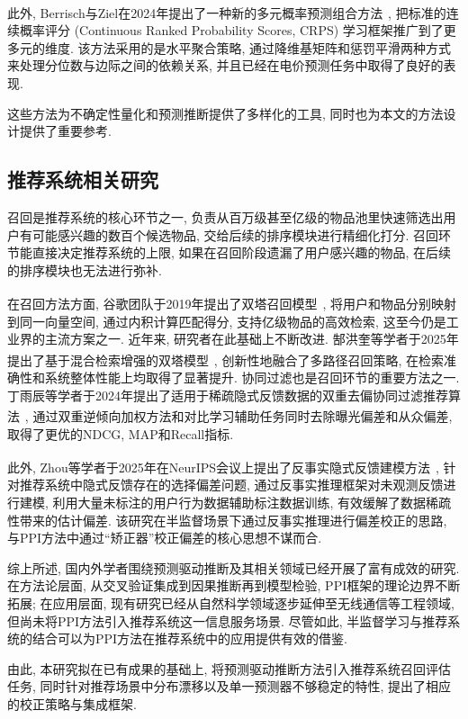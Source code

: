 \documentclass[a4paper, AutoFakeBold, UTF8]{ctexrep}
\theoremstyle{plain}
\newcommand{\upcite}[1]
{\textsuperscript{~\cite{#1}}}
\numberwithin{equation}{chapter}
\begin{document}
此外, Berrisch与Ziel在2024年提出了一种新的多元概率预测组合方法\upcite{Berrisch2024}, 把标准的连续概率评分 (Continuous Ranked Probability Scores, CRPS) 学习框架推广到了更多元的维度. 该方法采用的是水平聚合策略, 通过降维基矩阵和惩罚平滑两种方式来处理分位数与边际之间的依赖关系, 并且已经在电价预测任务中取得了良好的表现. 

这些方法为不确定性量化和预测推断提供了多样化的工具, 同时也为本文的方法设计提供了重要参考. 

\subsection{推荐系统相关研究}

召回是推荐系统的核心环节之一, 负责从百万级甚至亿级的物品池里快速筛选出用户有可能感兴趣的数百个候选物品, 交给后续的排序模块进行精细化打分. 召回环节能直接决定推荐系统的上限, 如果在召回阶段遗漏了用户感兴趣的物品, 在后续的排序模块也无法进行弥补. 

在召回方法方面, 谷歌团队于2019年提出了双塔召回模型\upcite{Yi2019}, 将用户和物品分别映射到同一向量空间, 通过内积计算匹配得分, 支持亿级物品的高效检索, 这至今仍是工业界的主流方案之一. 近年来, 研究者在此基础上不断改进. 郜洪奎等学者于2025年提出了基于混合检索增强的双塔模型\upcite{Gao2025}, 创新性地融合了多路径召回策略, 在检索准确性和系统整体性能上均取得了显著提升. 协同过滤也是召回环节的重要方法之一. 丁雨辰等学者于2024年提出了适用于稀疏隐式反馈数据的双重去偏协同过滤推荐算法\upcite{DoubleDebias2024}, 通过双重逆倾向加权方法和对比学习辅助任务同时去除曝光偏差和从众偏差, 取得了更优的NDCG, MAP和Recall指标. 

此外, Zhou等学者于2025年在NeurIPS会议上提出了反事实隐式反馈建模方法\upcite{Zhou2025}, 针对推荐系统中隐式反馈存在的选择偏差问题, 通过反事实推理框架对未观测反馈进行建模, 利用大量未标注的用户行为数据辅助标注数据训练, 有效缓解了数据稀疏性带来的估计偏差. 该研究在半监督场景下通过反事实推理进行偏差校正的思路, 与PPI方法中通过``矫正器''校正偏差的核心思想不谋而合. 

综上所述, 国内外学者围绕预测驱动推断及其相关领域已经开展了富有成效的研究. 在方法论层面, 从交叉验证集成到因果推断再到模型检验, PPI框架的理论边界不断拓展; 在应用层面, 现有研究已经从自然科学领域逐步延伸至无线通信等工程领域, 但尚未将PPI方法引入推荐系统这一信息服务场景. 尽管如此, 半监督学习与推荐系统的结合可以为PPI方法在推荐系统中的应用提供有效的借鉴. 

由此, 本研究拟在已有成果的基础上, 将预测驱动推断方法引入推荐系统召回评估任务, 同时针对推荐场景中分布漂移以及单一预测器不够稳定的特性, 提出了相应的校正策略与集成框架. 
\end{document}
